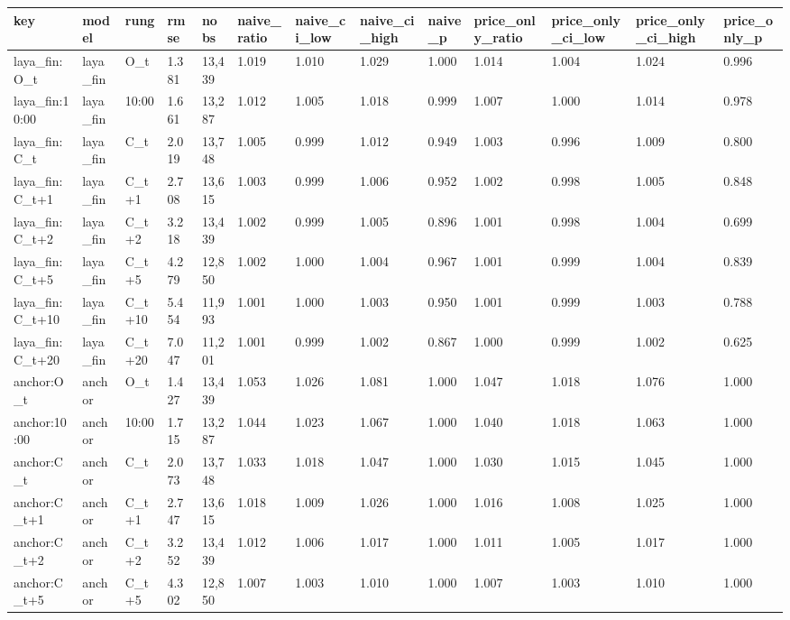 \begin{tabular}{lllllllllllll}
\toprule
key & model & rung & rmse & nobs & naive\_ratio & naive\_ci\_low & naive\_ci\_high & naive\_p & price\_only\_ratio & price\_only\_ci\_low & price\_only\_ci\_high & price\_only\_p \\
\midrule
laya\_fin:O\_t & laya\_fin & O\_t & 1.381 & 13,439 & 1.019 & 1.010 & 1.029 & 1.000 & 1.014 & 1.004 & 1.024 & 0.996 \\
laya\_fin:10:00 & laya\_fin & 10:00 & 1.661 & 13,287 & 1.012 & 1.005 & 1.018 & 0.999 & 1.007 & 1.000 & 1.014 & 0.978 \\
laya\_fin:C\_t & laya\_fin & C\_t & 2.019 & 13,748 & 1.005 & 0.999 & 1.012 & 0.949 & 1.003 & 0.996 & 1.009 & 0.800 \\
laya\_fin:C\_t+1 & laya\_fin & C\_t+1 & 2.708 & 13,615 & 1.003 & 0.999 & 1.006 & 0.952 & 1.002 & 0.998 & 1.005 & 0.848 \\
laya\_fin:C\_t+2 & laya\_fin & C\_t+2 & 3.218 & 13,439 & 1.002 & 0.999 & 1.005 & 0.896 & 1.001 & 0.998 & 1.004 & 0.699 \\
laya\_fin:C\_t+5 & laya\_fin & C\_t+5 & 4.279 & 12,850 & 1.002 & 1.000 & 1.004 & 0.967 & 1.001 & 0.999 & 1.004 & 0.839 \\
laya\_fin:C\_t+10 & laya\_fin & C\_t+10 & 5.454 & 11,993 & 1.001 & 1.000 & 1.003 & 0.950 & 1.001 & 0.999 & 1.003 & 0.788 \\
laya\_fin:C\_t+20 & laya\_fin & C\_t+20 & 7.047 & 11,201 & 1.001 & 0.999 & 1.002 & 0.867 & 1.000 & 0.999 & 1.002 & 0.625 \\
anchor:O\_t & anchor & O\_t & 1.427 & 13,439 & 1.053 & 1.026 & 1.081 & 1.000 & 1.047 & 1.018 & 1.076 & 1.000 \\
anchor:10:00 & anchor & 10:00 & 1.715 & 13,287 & 1.044 & 1.023 & 1.067 & 1.000 & 1.040 & 1.018 & 1.063 & 1.000 \\
anchor:C\_t & anchor & C\_t & 2.073 & 13,748 & 1.033 & 1.018 & 1.047 & 1.000 & 1.030 & 1.015 & 1.045 & 1.000 \\
anchor:C\_t+1 & anchor & C\_t+1 & 2.747 & 13,615 & 1.018 & 1.009 & 1.026 & 1.000 & 1.016 & 1.008 & 1.025 & 1.000 \\
anchor:C\_t+2 & anchor & C\_t+2 & 3.252 & 13,439 & 1.012 & 1.006 & 1.017 & 1.000 & 1.011 & 1.005 & 1.017 & 1.000 \\
anchor:C\_t+5 & anchor & C\_t+5 & 4.302 & 12,850 & 1.007 & 1.003 & 1.010 & 1.000 & 1.007 & 1.003 & 1.010 & 1.000 \\

\end{tabular}
